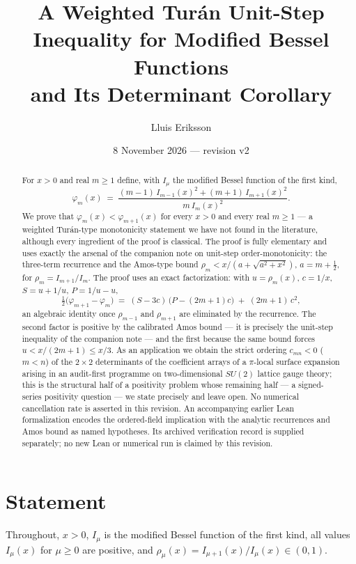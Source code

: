 \documentclass[11pt]{article}
\title{A Weighted Tur\'an Unit-Step Inequality for Modified Bessel Functions\\and Its Determinant Corollary}
\author{Lluis Eriksson}
\date{8 November 2026 --- revision v2}
\theoremstyle{remark}
\begin{document}
\maketitle

\begin{abstract}
For $x > 0$ and real $m \ge 1$ define, with $I_\mu$ the modified
Bessel function of the first kind,
\[
\varphi_m(x) \;=\;
\frac{(m-1)\,I_{m-1}(x)^2 + (m+1)\,I_{m+1}(x)^2}{m\,I_m(x)^2}.
\]
We prove that $\varphi_m(x) < \varphi_{m+1}(x)$ for every $x>0$ and
every real $m \ge 1$ --- a weighted Tur\'an-type monotonicity
statement we have not found in the literature, although every
ingredient of the proof is classical. The proof is fully elementary
and uses exactly the arsenal of the companion note on unit-step
order-monotonicity: the three-term recurrence and the Amos-type
bound $\rho_m < x/(a + \sqrt{a^2+x^2})$, $a = m + \tfrac12$, for
$\rho_m = I_{m+1}/I_m$. The proof uses an exact factorization:
with $u = \rho_m(x)$, $c = 1/x$, $S = u + 1/u$, $P = 1/u - u$,
\[
\tfrac12\bigl(\varphi_{m+1}-\varphi_m\bigr)
\;=\; (S - 3c)\,\bigl(P - (2m+1)c\bigr) \;+\; (2m+1)\,c^2 ,
\]
an algebraic identity once $\rho_{m-1}$ and $\rho_{m+1}$ are
eliminated by the recurrence. The second factor is positive by the
calibrated Amos bound --- it is precisely the unit-step inequality of
the companion note --- and the first because the same bound forces
$u < x/(2m+1) \le x/3$. As an application we obtain the strict
ordering $c_{mn} < 0$ ($m<n$) of the $2\times2$ determinants of the
coefficient arrays of a $\pi$-local surface expansion arising in an
audit-first programme on two-dimensional $SU(2)$ lattice gauge
theory; this is the structural half of a positivity problem whose
remaining half --- a signed-series positivity question --- we state
precisely and leave open. No numerical cancellation rate is asserted
in this revision. An accompanying earlier Lean formalization encodes the ordered-field
implication with the analytic recurrences and Amos bound as named
hypotheses. Its archived verification record is supplied separately;
no new Lean or numerical run is claimed by this revision.
\end{abstract}

\section{Statement}

Throughout, $x > 0$, $I_\mu$ is the modified Bessel function of the
first kind, all values $I_\mu(x)$ for $\mu \ge 0$ are positive, and
$\rho_\mu(x) = I_{\mu+1}(x)/I_\mu(x) \in (0,1)$.
\end{document}
